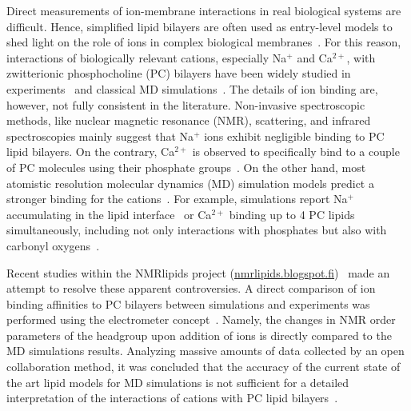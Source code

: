 \documentclass[aip,jcp,twocolumn]{revtex4}
\begin{document}
Direct measurements of ion-membrane interactions in real biological systems are difficult. 
Hence, simplified lipid bilayers are often used as entry-level models to shed light on the role of ions in complex biological membranes~\cite{scherer87,seelig90,cevc90}. 
For this reason, interactions of biologically relevant cations, especially Na$^+$ and Ca$^{2+}$, with zwitterionic phosphocholine (PC) bilayers have been widely studied in experiments~\cite{akutsu81, altenbach84, seelig90, cevc90, tocanne90, binder02, pabst07, uhrikova08} and classical MD simulations~\cite{bockmann03, bockmann04, Berkowitz12, melcrova16, javanainen17}. The details of ion binding are, however, not fully consistent in the literature. Non-invasive spectroscopic methods, like nuclear magnetic resonance (NMR), scattering, and infrared spectroscopies mainly suggest that Na$^+$ ions exhibit negligible binding to PC lipid bilayers. On the contrary, Ca$^{2+}$ is observed to specifically bind to a couple of PC molecules using their phosphate groups~\cite{hauser76, hauser78, herbette84, akutsu81, altenbach84, binder02, pabst07, uhrikova08}. On the other hand, most atomistic resolution molecular dynamics (MD) simulation models predict a stronger binding for the cations~\cite{catte16}. For example, simulations report Na$^+$ accumulating in the lipid interface~\cite{bockmann03} or Ca$^{2+}$ binding up to 4 PC lipids simultaneously, including not only interactions with phosphates but also with carbonyl oxygens~\cite{bockmann04, melcrova16, javanainen17}.

Recent studies within the NMRlipids project (\url{nmrlipids.blogspot.fi})~\cite{catte16} made an attempt to resolve these apparent controversies. A direct comparison of ion binding affinities to PC bilayers between simulations and experiments was performed using the electrometer concept~\cite{seelig87}. Namely, the changes in NMR order parameters of the headgroup upon addition of ions is directly compared to the MD simulations results. 
Analyzing massive amounts of data collected by an open collaboration method, 
it was concluded that the accuracy of the current state of the art lipid models for MD simulations is not sufficient for a detailed interpretation of the interactions of cations with PC lipid bilayers~\cite{catte16}.
\end{document}
